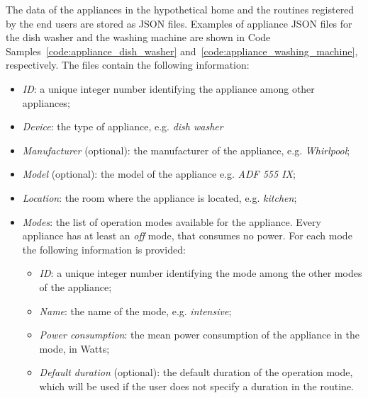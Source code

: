 The data of the appliances in the hypothetical home and the routines registered by the end users are stored as JSON files.
Examples of appliance JSON files for the dish washer and the washing machine are shown in Code Samples~\ref{code:appliance_dish_washer} and~\ref{code:appliance_washing_machine}, respectively. The files contain the following information:
\begin{itemize}
    \item \textit{ID}: a unique integer number identifying the appliance among other appliances;
    \item \textit{Device}: the type of appliance, e.g. \textit{dish washer}
    \item \textit{Manufacturer} (optional): the manufacturer of the appliance, e.g. \textit{Whirlpool};
    \item \textit{Model} (optional): the model of the appliance e.g. \textit{ADF 555 IX};
    \item \textit{Location}: the room where the appliance is located, e.g. \textit{kitchen};
    \item \textit{Modes}: the list of operation modes available for the appliance. Every appliance has at least an \textit{off} mode, that consumes no power. For each mode the following information is provided:
        \begin{itemize}
            \item \textit{ID}: a unique integer number identifying the mode among the other modes of the appliance;
            \item \textit{Name}: the name of the mode, e.g. \textit{intensive};
            \item \textit{Power consumption}: the mean power consumption of the appliance in the mode, in Watts;
            \item \textit{Default duration} (optional): the default duration of the operation mode, which will be used if the user does not specify a duration in the routine.
        \end{itemize}
\end{itemize}





